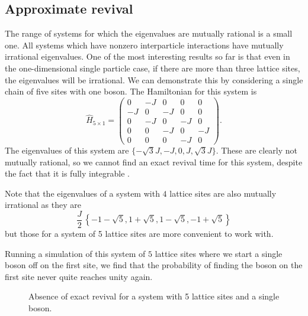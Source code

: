 \documentclass[prb, twocolumn, final]{revtex4-1}
\theoremstyle{plain}
\begin{document}
\subsection{Approximate revival}

The range of systems for which the eigenvalues are mutually rational is a small
one. All systems which have nonzero interparticle interactions have mutually
irrational eigenvalues. One of the most interesting results so far is that
even in the one-dimensional single particle case, if there are more than
three lattice sites, the eigenvalues will be irrational. We can demonstrate this
by considering a single chain of five sites with one boson. The Hamiltonian for
this system is
\begin{equation}
    \hat{H}_{5\times1}
    =
    \begin{pmatrix}
         0 & -J &  0 &  0 &  0 \\
        -J &  0 & -J &  0 &  0 \\
         0 & -J &  0 & -J &  0 \\
         0 &  0 & -J &  0 & -J \\
         0 &  0 &  0 & -J &  0
    \end{pmatrix}.
\end{equation}
The eigenvalues of this system are $\lbrace -\sqrt{3}J, -J, 0, J, \sqrt{3}J
\rbrace$. These are clearly not mutually rational, so we cannot find an exact
revival time for this system, despite the fact that it is fully integrable
\cite{Rigol2007}.

Note that the eigenvalues of a system with $4$ lattice sites are also mutually
irrational as they are
\begin{equation*}
    \frac{J}{2}\,
    \left \lbrace
        -1 - \sqrt{5}, 1 + \sqrt{5}, 1 - \sqrt{5}, -1 + \sqrt{5}
    \right \rbrace
\end{equation*}
but those for a system of 5 lattice sites are more convenient to work with.

Running a simulation of this system of $5$ lattice sites where we start a single
boson off on the first site, we find that the probability of finding the boson
on the first site never quite reaches unity again.
\begin{figure}[H]
     \caption{Absence of exact revival for a system with 5 lattice sites and a
              single boson.}
\end{figure}
\end{document}

